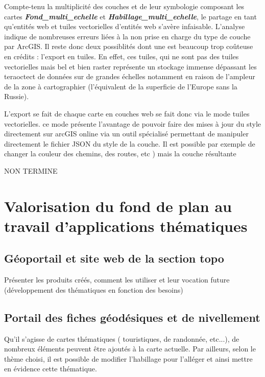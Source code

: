 Compte-tenu la multiplicité des couches et de leur symbologie composant les cartes \textbf{\textit{Fond\_multi\_echelle}} et \textbf{\textit{Habillage\_multi\_echelle}}, le partage en tant qu'entités web et tuiles vectorielles d'entités web s'avère infaisable. L'analyse indique de nombreuses erreurs liées à la non prise en charge du type de couche par ArcGIS.
Il reste donc deux possiblités dont une est beaucoup trop coûteuse en crédits : l'export en tuiles. En effet, ces tuiles, qui ne sont pas des tuiles vectorielles mais bel et bien raster représente un stockage immense dépassant les teraoctect de données sur de grandes échelles notamment en raison de l'ampleur de la zone à cartographier (l'équivalent de la superficie de l'Europe sans la Russie).

L'export se fait de chaque carte en couches web se fait donc via le mode tuiles vectorielles. ce mode présente l'avantage de pouvoir faire des mises à jour du style directement sur arcGIS online via un outil spécialisé permettant de manipuler directement le fichier JSON du style de la couche. Il est possible par exemple de changer la couleur des chemins, des routes, etc ) mais la couche résultante 


NON TERMINE





\section{Valorisation du fond de plan au travail d'applications thématiques}

\subsection{Géoportail et site web de la section topo}
{\color{magenta} Présenter les produits créés, comment les utiliser et leur vocation future (développement des thématiques en fonction des besoins)}

\subsection{Portail des fiches géodésiques et de nivellement}


 Qu'il s'agisse de cartes thématiques ( touristiques, de randonnée, etc...), de nombreux éléments peuvent être ajoutés à la carte actuelle. Par ailleurs, selon le thème choisi, il est possible de modifier l'habillage pour l'alléger et ainsi mettre en évidence cette thématique.

